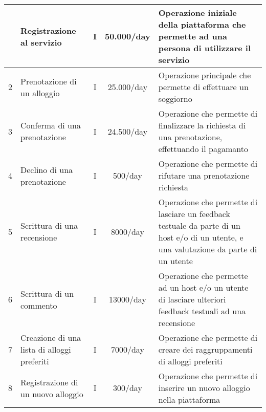\begin{longtable}{|c|p{3cm}|c|c|p{4.18cm}|}
    \hline
    \endlastfoot
    1         & Registrazione al servizio                                                                   & {I}           & 50.000/day         & Operazione iniziale della piattaforma che permette ad una persona di utilizzare il servizio                                                              \\\hline
    2         & Prenotazione di un alloggio                                                                 & {I}           & 25.000/day         & Operazione principale che permette di effettuare un soggiorno                                                                                            \\\hline
    3         & Conferma di una prenotazione                                                                & {I}           & 24.500/day         & {Operazione che permette di finalizzare la richiesta di una prenotazione, effettuando il pagamanto}                                                      \\\hline
    4         & Declino di una prenotazione                                                                 & {I}           & 500/day            & Operazione che permette di rifutare una prenotazione richiesta                                                                                           \\\hline
    5         & Scrittura di una recensione                                                                 & {I}           & 8000/day           & {Operazione che permette di lasciare un feedback testuale da parte di un host e/o di un utente, e una valutazione da parte di un utente}                 \\\hline
    6         & Scrittura di un commento                                                                    & {I}           & 13000/day          & {Operazione che permette ad un host e/o un utente di lasciare ulteriori feedback testuali ad una recensione}                                             \\\hline
    7         & Creazione di una lista di alloggi preferiti                                                 & {I}           & 7000/day           & Operazione che permette di creare dei raggruppamenti di alloggi preferiti                                                                                \\\hline
    8         & Registrazione di un nuovo alloggio                                                          & {I}           & 300/day            & Operazione che permette di inserire un nuovo alloggio nella piattaforma                                                                                  \\\hline

\end{longtable}
